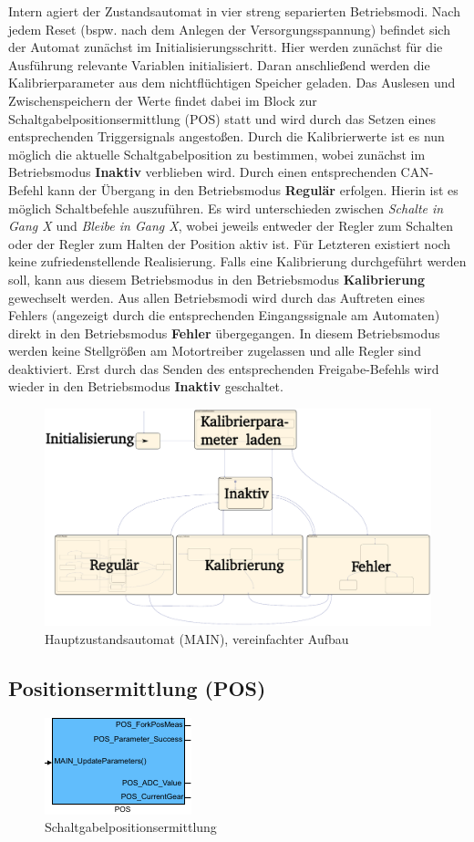 Intern agiert der Zustandsautomat in vier streng separierten Betriebsmodi. Nach jedem Reset (bspw. nach dem Anlegen der Versorgungsspannung) befindet sich der Automat zunächst im Initialisierungsschritt. Hier werden zunächst für die Ausführung relevante Variablen initialisiert. Daran anschließend werden die Kalibrierparameter aus dem nichtflüchtigen Speicher geladen. Das Auslesen und Zwischenspeichern der Werte findet dabei im Block zur Schaltgabelpositionsermittlung (POS) statt und wird durch das Setzen eines entsprechenden Triggersignals angestoßen. Durch die Kalibrierwerte ist es nun möglich die aktuelle Schaltgabelposition zu bestimmen, wobei zunächst im Betriebsmodus \textbf{Inaktiv} verblieben wird. Durch einen entsprechenden CAN-Befehl kann der Übergang in den Betriebsmodus \textbf{Regulär} erfolgen. Hierin ist es möglich Schaltbefehle auszuführen. Es wird unterschieden zwischen \textit{Schalte in Gang X} und \textit{Bleibe in Gang X}, wobei jeweils entweder der Regler zum Schalten oder der Regler zum Halten der Position aktiv ist. Für Letzteren existiert noch keine zufriedenstellende Realisierung. Falls eine Kalibrierung durchgeführt werden soll, kann aus diesem Betriebsmodus in den Betriebsmodus \textbf{Kalibrierung} gewechselt werden. Aus allen Betriebsmodi wird durch das Auftreten eines Fehlers (angezeigt durch die entsprechenden Eingangssignale am Automaten) direkt in den Betriebsmodus \textbf{Fehler} übergegangen. In diesem Betriebsmodus werden keine Stellgrößen am Motortreiber zugelassen und alle Regler sind deaktiviert. Erst durch das Senden des entsprechenden Freigabe-Befehls wird wieder in den Betriebsmodus \textbf{Inaktiv} geschaltet.
 
\begin{figure}[H]%
\centering
\includegraphics[width=0.6\columnwidth]{./Bilder/fig_main_detail}%
\caption{Hauptzustandsautomat (MAIN), vereinfachter Aufbau}%
\label{fig_main_detail}%
\end{figure}

\subsection{Positionsermittlung (POS)}\label{lagesens}
\begin{figure}[H]%
\centering
\includegraphics[width=0.3\columnwidth]{./Bilder/fig_POS}%
\caption{Schaltgabelpositionsermittlung}%
\label{fig_POS}%
\end{figure}

